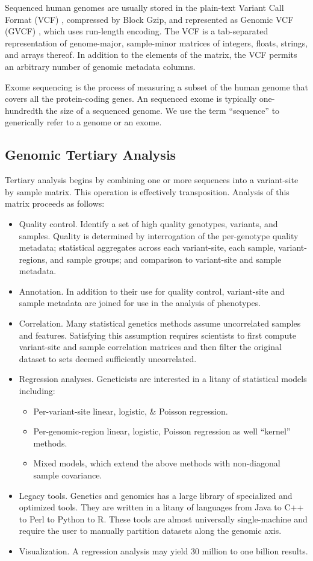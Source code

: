 \documentclass[10pt,a4paper%
]{article}
\begin{document}
Sequenced human genomes are usually stored in the plain-text Variant Call Format (VCF) \cite{vcf4.3},
compressed by Block Gzip, and represented as Genomic VCF (GVCF) \cite{gvcf}, which uses run-length
encoding. The VCF is a tab-separated representation of genome-major, sample-minor matrices of
integers, floats, strings, and arrays thereof. In addition to the elements of the matrix, the VCF
permits an arbitrary number of genomic metadata columns.

Exome sequencing is the process of measuring a subset of the human genome that covers all the
protein-coding genes. An sequenced exome is typically one-hundredth the size of a sequenced
genome. We use the term ``sequence'' to generically refer to a genome or an exome.

\subsection{Genomic Tertiary Analysis}

Tertiary analysis begins by combining one or more sequences into a variant-site by sample
matrix. This operation is effectively transposition. Analysis of this matrix proceeds as follows:

\begin{itemize}
\item Quality control. Identify a set of high quality genotypes, variants, and samples. Quality is
  determined by interrogation of the per-genotype quality metadata; statistical aggregates across
  each variant-site, each sample, variant-regions, and sample groups; and comparison to variant-site
  and sample metadata.
\item Annotation. In addition to their use for quality control, variant-site and sample metadata are
  joined for use in the analysis of phenotypes.
\item Correlation. Many statistical genetics methods assume uncorrelated samples and
  features. Satisfying this assumption requires scientists to first compute variant-site and sample
  correlation matrices and then filter the original dataset to sets deemed sufficiently uncorrelated.
\item Regression analyses. Geneticists are interested in a litany of statistical models including:
  \begin{itemize}
  \item Per-variant-site linear, logistic, \& Poisson regression.
  \item Per-genomic-region linear, logistic, Poisson regression as well ``kernel'' methods.
  \item Mixed models, which extend the above methods with non-diagonal sample covariance.
  \end{itemize}
\item Legacy tools. Genetics and genomics has a large library of specialized and optimized
  tools. They are written in a litany of languages from Java to C++ to Perl to Python to R. These
  tools are almost universally single-machine and require the user to manually partition datasets
  along the genomic axis.
\item Visualization. A regression analysis may yield 30 million to one billion results.
\end{itemize}
\end{document}
